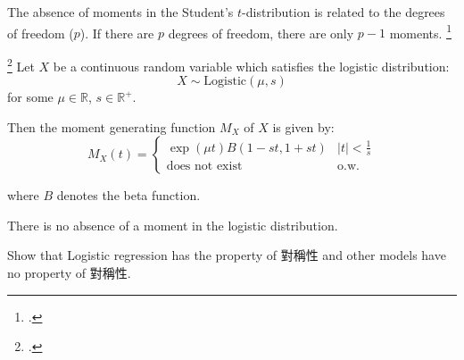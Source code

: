 \documentclass[UTF8,a4paper,10pt]{article}
\begin{document}
The absence of moments in the Student's $t$-distribution is related to the degrees of freedom ($p$). If there are \(p\) degrees of freedom, there are only \(p-1\) moments. \footcite[][224]{Casella2002}

\dotfill

\footcite{logistic_MGF}
Let $X$ be a continuous random variable which satisfies the logistic distribution:
\[X \sim \text{Logistic}(\mu, s)\]
for some $\mu \in \mathbb{R}$, $s \in \mathbb{R}^+$. 

Then the moment generating function $M_X$ of $X$ is given by:
\[M_X(t) = 
\begin{cases}
\exp(\mu t)B\left(1 - st, 1 + st\right) &  |t| < \frac{1}{s} \\
\text{does not exist} &\text{o.w.} 
\end{cases}
\]

where $B$ denotes the beta function.

There is no absence of a moment in the logistic distribution.


\pagebreak

\begin{Problem}[]{}
  

  Show that Logistic regression has the property of 對稱性 and other models have no property of 對稱性.
\end{Problem}
\end{document}

